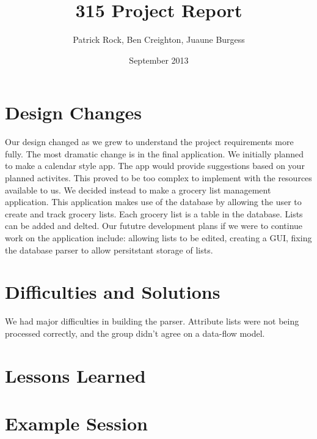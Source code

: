 \documentclass{article}
\title{315 Project Report}
\author{Patrick Rock, Ben Creighton, Juaune Burgess}
\date{September 2013}
\begin{document}
\maketitle

\section{Design Changes}
Our design changed as we grew to understand the project requirements more fully. The most dramatic change 
is in the final application. We initially planned to make a calendar style app. The app would provide suggestions
based on your planned activites. This proved to be too complex to implement with the resources available to us. 
We decided instead to make a grocery list management application. This application makes use of the database by 
allowing the user to create and track grocery lists. Each grocery list is a table in the database. Lists can 
be added and delted. Our fututre development plans if we were to continue work on the application include:
allowing lists to be edited, creating a GUI, fixing the database parser to allow persitstant storage of lists. 

\section{Difficulties and Solutions}
We had major difficulties in building the parser.
Attribute lists were not being processed correctly, and the group didn’t agree on a data-flow model.

\section{Lessons Learned}

\section{Example Session}
\end{document}
